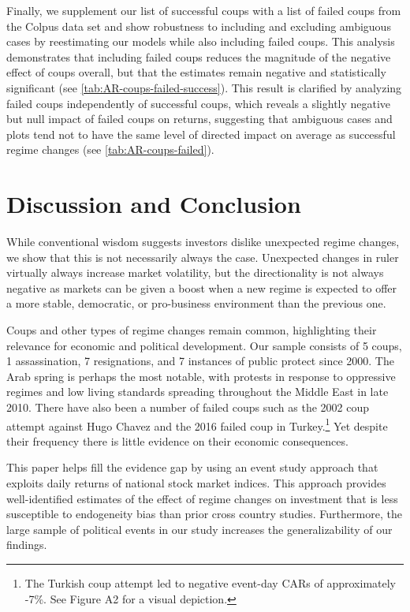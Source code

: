\documentclass[12pt,final,fleqn]{article}
\theoremstyle{plain}
\begin{document}
Finally, we supplement our list of successful coups with a list of failed coups from the Colpus data set \citep{chin2021varieties} and show robustness to including and excluding ambiguous cases by reestimating our models while also including failed coups. This analysis demonstrates that including failed coups reduces the magnitude of the negative effect of coups overall, but that the estimates remain negative and statistically significant (see \autoref{tab:AR-coups-failed-success}). This result is clarified by analyzing failed coups independently of successful coups, which reveals a slightly negative but null impact of failed coups on returns, suggesting that ambiguous cases and plots tend not to have the same level of directed impact on average as successful regime changes (see \autoref{tab:AR-coups-failed}).  

\section{Discussion and Conclusion}

While conventional wisdom suggests investors dislike unexpected regime changes, we show that this is not necessarily always the case. Unexpected changes in ruler virtually always increase market volatility, but the directionality is not always negative as markets can be given a boost when a new regime is expected to offer a more stable, democratic, or pro-business environment than the previous one. 

Coups and other types of regime changes remain common, highlighting their relevance for economic and political development. Our sample consists of 5 coups, 1 assassination, 7 resignations, and 7 instances of public protect since 2000. The Arab spring is perhaps the most notable, with protests in response to oppressive regimes and low living standards spreading throughout the Middle East in late 2010. There have also been a number of failed coups such as the 2002 coup attempt against Hugo Chavez and the 2016 failed coup in Turkey.\footnote{The Turkish coup attempt led to negative event-day CARs of approximately -7\%. See Figure A2 for a visual depiction.} Yet despite their frequency there is little evidence on their economic consequences.

This paper helps fill the evidence gap by using an event study approach that exploits daily returns of national stock market indices. This approach provides well-identified estimates of the effect of regime changes on investment that is less susceptible to endogeneity bias than prior cross country studies. Furthermore, the large sample of political events in our study increases the generalizability of our findings.  
\end{document}
